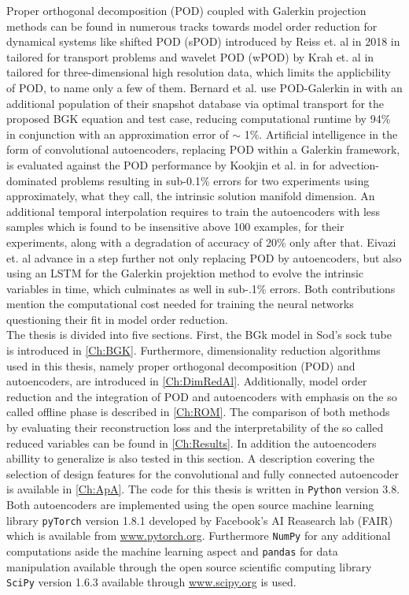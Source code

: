 Proper orthogonal decomposition (POD) coupled with Galerkin projection methods can be found in numerous tracks towards model order reduction for dynamical systems like shifted POD (sPOD) introduced by Reiss et. al in 2018 in \cite{reiss2018shifted} tailored for transport problems and wavelet POD (wPOD) by Krah et. al in \cite{krah2020wavelet}  tailored for three-dimensional high resolution data, which limits the applicbility of POD, to name only a few of them. Bernard et al. use POD-Galerkin  in \cite{Bernard} with an additional population of their snapshot database via optimal transport for the proposed BGK equation and test case, reducing computational runtime by 94\% in conjunction with an approximation error of \(\sim\) 1\%. Artificial intelligence in the form of convolutional autoencoders, replacing POD within a Galerkin framework, is evaluated against the POD performance by Kookjin et al. in \cite{Carlberg} for advection-dominated problems resulting in sub-0.1\% errors for two experiments using approximately, what they call, the intrinsic solution manifold dimension. An additional temporal interpolation requires to train the autoencoders with less samples which is found to be insensitive above 100 examples, for their experiments, along with a degradation of accuracy of 20\% only after that. Eivazi et. al advance in \cite{eivazi2021recurrent} a step further not only replacing POD by autoencoders, but also using an LSTM for the Galerkin projektion method to evolve the intrinsic variables in time, which culminates as well in sub-.1\% errors. Both contributions mention the computational cost needed for training the neural networks questioning their fit in model order reduction.\\ 

The thesis is divided into five sections. First, the BGk model in Sod's sock tube is introduced in \cref{Ch:BGK}. Furthermore, dimensionality reduction algorithms used in this thesis, namely proper orthogonal decomposition (POD) and autoencoders, are introduced in \cref{Ch:DimRedAl}. Additionally, model order reduction and the integration of POD and autoencoders with emphasis on the so called offline phase is described in \cref{Ch:ROM}. The comparison of both methods by evaluating their reconstruction loss and the interpretability of the so called reduced variables can be found in \cref{Ch:Results}. In addition the autoencoders abillity to generalize is also tested in this section. A description covering the selection of design features for the convolutional and fully connected autoencoder is available in \cref{Ch:ApA}. The code for this thesis is written in \texttt{Python} version 3.8. Both autoencoders are implemented using the open source machine learning library \texttt{pyTorch} version 1.8.1 developed by Facebook's AI Reasearch lab (FAIR) which is available from \url{www.pytorch.org}. Furthermore \texttt{NumPy} for any additional computations aside the machine learning aspect and \texttt{pandas} for data manipulation available through the open source scientific computing library \texttt{SciPy} version 1.6.3 available through \url{www.scipy.org} is used.\\  
